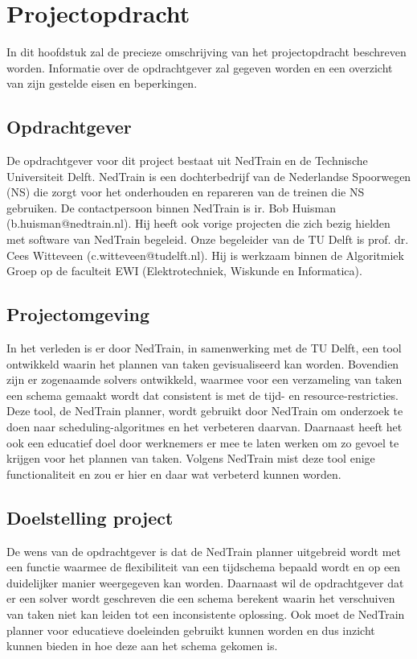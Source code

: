 \section{Projectopdracht}
In dit hoofdstuk zal de precieze omschrijving van het projectopdracht beschreven worden. Informatie over de opdrachtgever zal gegeven worden en een overzicht van zijn gestelde eisen en beperkingen.\\

\subsection{Opdrachtgever}
De opdrachtgever voor dit project bestaat uit NedTrain en de Technische Universiteit Delft.
NedTrain is een dochterbedrijf van de Nederlandse Spoorwegen (NS) die zorgt voor het onderhouden en repareren van de treinen die NS gebruiken. De contactpersoon binnen NedTrain is ir. Bob Huisman (b.huisman@nedtrain.nl). Hij heeft ook vorige projecten die zich bezig hielden met software van NedTrain begeleid. Onze begeleider van de TU Delft is prof. dr. Cees Witteveen (c.witteveen@tudelft.nl). Hij is werkzaam binnen de Algoritmiek Groep op de faculteit EWI (Elektrotechniek, Wiskunde en Informatica).\\

\subsection{Projectomgeving}
In het verleden is er door NedTrain, in samenwerking met de TU Delft, een tool ontwikkeld waarin het plannen van taken gevisualiseerd kan worden. Bovendien zijn er zogenaamde solvers ontwikkeld, waarmee voor een verzameling van taken een schema gemaakt wordt dat consistent is met de tijd- en resource-restricties. Deze tool, de NedTrain planner, wordt gebruikt door NedTrain om onderzoek te doen naar scheduling-algoritmes en het verbeteren daarvan. Daarnaast heeft het ook een educatief doel door werknemers er mee te laten werken om zo gevoel te krijgen voor het plannen van taken. Volgens NedTrain mist deze tool enige functionaliteit en zou er hier en daar wat verbeterd kunnen worden.\\

\subsection{Doelstelling project}
De wens van de opdrachtgever is dat de NedTrain planner uitgebreid wordt met een functie waarmee de flexibiliteit van een tijdschema bepaald wordt en op een duidelijker manier weergegeven kan worden. Daarnaast wil de opdrachtgever dat er een solver wordt geschreven die een schema berekent waarin het verschuiven van taken niet kan leiden tot een inconsistente oplossing. Ook moet de NedTrain planner voor educatieve doeleinden gebruikt kunnen worden en dus inzicht kunnen bieden in hoe deze aan het schema gekomen is.\\

